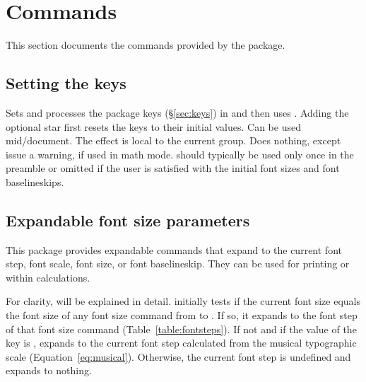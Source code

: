 \documentclass{beery}
\begin{document}
\section{Commands}
\label{sec:commands}

This section documents the commands provided by the  package.

\subsection{Setting the keys}
\label{subsec:fontscalesetup}

 \sarg{} 
\KeepNextPar*

Sets and processes the  package keys (\S\ref{sec:keys}) in  and then uses .
Adding the optional star first resets the keys to their initial values.
Can be used mid\-/document.
The effect is local to the current group.
Does nothing, except issue a warning, if used in math mode.
 should typically be used only once in the preamble or omitted if the user is satisfied with the initial font sizes and font baselineskips.

\subsection{Expandable font size parameters}
\label{subsec:expandable}

\nopagebreak\newline
{}
\newline
{}
\nopagebreak\newline
{}

This package provides expandable commands that expand to the current font step, font scale, font size, or font baselineskip.
They can be used for printing or within calculations.

For clarity,  will be explained in detail.
 initially tests if the current font size equals the font size of any font size command from  to .
If so, it expands to the font step of that font size command (Table~\ref{table:fontsteps}).
If not and if the value of the key  is ,  expands to the current font step calculated from the musical typographic scale (Equation~\ref{eq:musical}).
Otherwise, the current font step is undefined and  expands to nothing.
\end{document}
